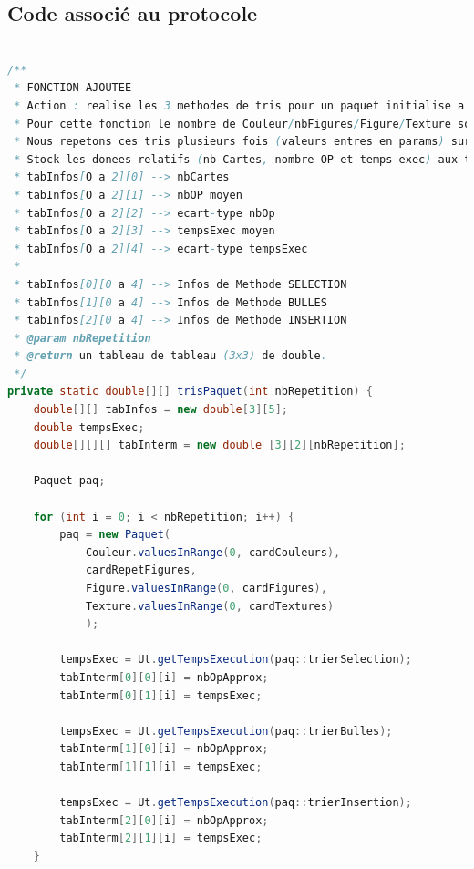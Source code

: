 \documentclass{report}
\begin{document}
\pagebreak
\subsection{Code associé au protocole}

\begin{lstlisting}[language=java, caption={\it Fonctions de calculs de données expérimentales}, label=codeTRI]

/**
 * FONCTION AJOUTEE
 * Action : realise les 3 methodes de tris pour un paquet initialise a nbCartes nombre de carte.
 * Pour cette fonction le nombre de Couleur/nbFigures/Figure/Texture sont fixes (variables de classes : cardCouleurs, cardRepetFigures, cardFigures, cardTextures).
 * Nous repetons ces tris plusieurs fois (valeurs entres en params) sur des paquets presentant les memes caracteristiques mais melanges differremment ; pour obtenir des donnees significatifs :
 * Stock les donees relatifs (nb Cartes, nombre OP et temps exec) aux tris dans un tableau de tableau.
 * tabInfos[O a 2][0] --> nbCartes
 * tabInfos[O a 2][1] --> nbOP moyen
 * tabInfos[O a 2][2] --> ecart-type nbOp
 * tabInfos[O a 2][3] --> tempsExec moyen
 * tabInfos[O a 2][4] --> ecart-type tempsExec
 * 
 * tabInfos[0][0 a 4] --> Infos de Methode SELECTION
 * tabInfos[1][0 a 4] --> Infos de Methode BULLES
 * tabInfos[2][0 a 4] --> Infos de Methode INSERTION
 * @param nbRepetition
 * @return un tableau de tableau (3x3) de double.
 */
private static double[][] trisPaquet(int nbRepetition) {
    double[][] tabInfos = new double[3][5];
    double tempsExec;
    double[][][] tabInterm = new double [3][2][nbRepetition];

    Paquet paq;

    for (int i = 0; i < nbRepetition; i++) {
        paq = new Paquet(
            Couleur.valuesInRange(0, cardCouleurs), 
            cardRepetFigures, 
            Figure.valuesInRange(0, cardFigures), 
            Texture.valuesInRange(0, cardTextures)
            );

        tempsExec = Ut.getTempsExecution(paq::trierSelection);
        tabInterm[0][0][i] = nbOpApprox;
        tabInterm[0][1][i] = tempsExec;

        tempsExec = Ut.getTempsExecution(paq::trierBulles);
        tabInterm[1][0][i] = nbOpApprox;
        tabInterm[1][1][i] = tempsExec;

        tempsExec = Ut.getTempsExecution(paq::trierInsertion);
        tabInterm[2][0][i] = nbOpApprox;
        tabInterm[2][1][i] = tempsExec;   
    }


\end{lstlisting}
\end{document}
